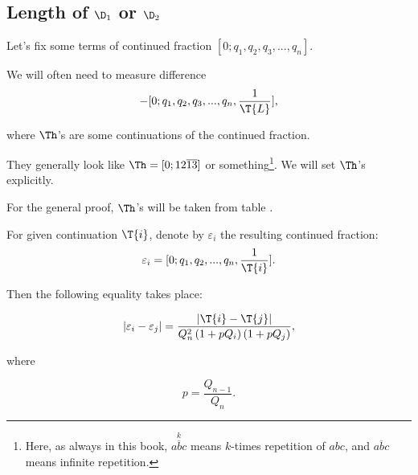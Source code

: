 \subsection{Length of $\D_1$ or $\D_2$}

Let's fix some terms of continued fraction $[0; q_1, q_2, q_3, ..., q_n]$.

We will often need to measure difference
\begin{equation*}
	[0; q_1, q_2, q_3, ..., q_n, \frac{1}{\T{R}}] - 
	[0; q_1, q_2, q_3, ..., q_n, \frac{1}{\T{L}}],
\end{equation*}

where $\Th$'s are some continuations of the continued fraction.

They generally look like $\Th = [0;12\overline{13}]$ or something\footnote{%
	Here, as always in this book, $\overset{k}{\overline{abc}}$
	means $k$-times repetition of $abc$,
	and $\overline{abc}$ means infinite repetition.}.
We will set $\Th$'s explicitly.

For the general proof, $\Th$'s will be taken from table .

\begin{designation}
	For given continuation $\T{i}$, denote by $\varepsilon_i$ the resulting continued fraction:
	\begin{equation*}
		\varepsilon_i = [0; q_1, q_2, ..., q_n, \frac{1}{\T{i}}].
	\end{equation*}
\end{designation}

Then the following equality takes place:

\begin{equation}\label{varepsilons_difference}
	| \varepsilon_i - \varepsilon_j | = 
	\dfrac{| \T{i} - \T{j} |}
	{Q_n^2 \left(1 + pQ_i\right) \left(1 + pQ_j\right)},
\end{equation}

where

\begin{equation*}
	p = \dfrac{Q_{n-1}}{Q_n}.
\end{equation*}
